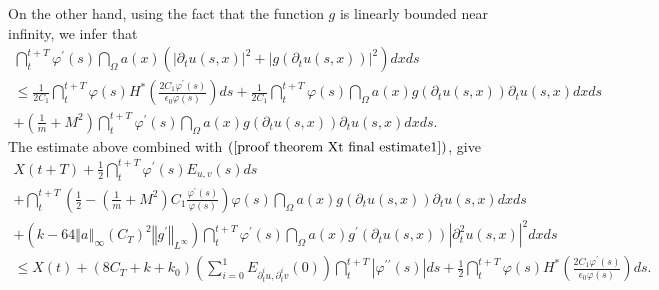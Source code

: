 \documentclass[11pt,reqno]{amsart}
\theoremstyle{plain}
\numberwithin{equation}{section}
\numberwithin{equation}{section}
\begin{document}
On the other hand, using the fact that the function $g$ is linearly bounded
near infinity, we infer that%
\begin{equation*}
\begin{array}{l}
\dint_{t}^{t+T}\varphi ^{\prime }\left( s\right) \dint_{\Omega }a\left(
x\right) \left( \left\vert \partial _{t}u\left( s,x\right) \right\vert
^{2}+\left\vert g\left( \partial _{t}u\left( s,x\right) \right) \right\vert
^{2}\right) dxds \\ 
\leq \frac{1}{2C_{1}}\dint_{t}^{t+T}\varphi \left( s\right) H^{\ast }\left( 
\frac{2C_{1}\varphi ^{\prime }\left( s\right) }{\epsilon _{0}\varphi \left(
s\right) }\right) ds+\frac{1}{2C_{1}}\dint_{t}^{t+T}\varphi \left( s\right)
\dint_{\Omega }a\left( x\right) g\left( \partial _{t}u\left( s,x\right)
\right) \partial _{t}u\left( s,x\right) dxds \\ 
+\left( \frac{1}{m}+M^{2}\right) \dint_{t}^{t+T}\varphi ^{\prime }\left(
s\right) \dint_{\Omega }a\left( x\right) g\left( \partial _{t}u\left(
s,x\right) \right) \partial _{t}u\left( s,x\right) dxds.%
\end{array}%
\end{equation*}%
The estimate above combined with $\left( \ref{proof theorem Xt final
estimate1}\right) $, give%
\begin{equation}
\begin{array}{l}
X\left( t+T\right) +\frac{1}{2}\dint_{t}^{t+T}\varphi ^{\prime }\left(
s\right) E_{u,v}\left( s\right) ds \\ 
+\dint_{t}^{t+T}\left( \frac{1}{2}-\left( \frac{1}{m}+M^{2}\right) C_{1}%
\frac{\varphi ^{\prime }\left( s\right) }{\varphi \left( s\right) }\right)
\varphi \left( s\right) \dint_{\Omega }a\left( x\right) g\left( \partial
_{t}u\left( s,x\right) \right) \partial _{t}u\left( s,x\right) dxds \\ 
+\left( k-64\left\Vert a\right\Vert _{\infty }\left( C_{T}\right)
^{2}\left\Vert g^{\prime }\right\Vert _{L^{\infty }}\right)
\dint_{t}^{t+T}\varphi ^{\prime }\left( s\right) \dint_{\Omega }a\left(
x\right) g^{\prime }\left( \partial _{t}u\left( s,x\right) \right)
\left\vert \partial _{t}^{2}u\left( s,x\right) \right\vert ^{2}dxds \\ 
\leq X\left( t\right) +\left( 8C_{T}+k+k_{0}\right) \left(
\sum_{i=0}^{1}E_{\partial _{t}^{i}u,\partial _{t}^{i}v}\left( 0\right)
\right) \dint_{t}^{t+T}\left\vert \varphi ^{\prime \prime }\left( s\right)
\right\vert ds+\frac{1}{2}\dint_{t}^{t+T}\varphi \left( s\right) H^{\ast
}\left( \frac{2C_{1}\varphi ^{\prime }\left( s\right) }{\epsilon _{0}\varphi
\left( s\right) }\right) ds.%
\end{array}
\label{proof theorem Xt final estimate}
\end{equation}%
\end{document}
